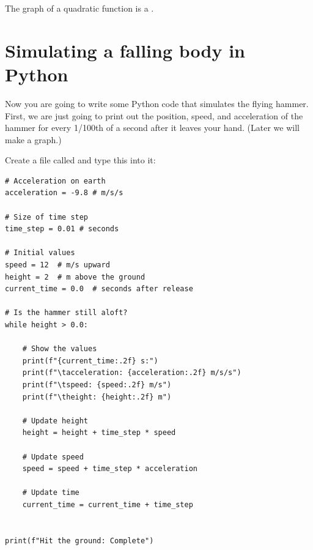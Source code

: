 \hspace{4mm}

The graph of a quadratic function is a .

\section{Simulating a falling body in Python}

Now you are going to write some Python code that simulates the flying hammer. First, we are just going to print out the position, speed, and acceleration of the hammer for every 1/100th of a second after it leaves your hand. (Later we will make a graph.)

Create a file called  and type this into it:

\begin{Verbatim}
# Acceleration on earth
acceleration = -9.8 # m/s/s

# Size of time step
time_step = 0.01 # seconds

# Initial values
speed = 12  # m/s upward
height = 2  # m above the ground
current_time = 0.0  # seconds after release

# Is the hammer still aloft?
while height > 0.0:

    # Show the values
    print(f"{current_time:.2f} s:")
    print(f"\tacceleration: {acceleration:.2f} m/s/s")
    print(f"\tspeed: {speed:.2f} m/s")
    print(f"\theight: {height:.2f} m")

    # Update height
    height = height + time_step * speed

    # Update speed
    speed = speed + time_step * acceleration

    # Update time
    current_time = current_time + time_step


print(f"Hit the ground: Complete")
\end{Verbatim}

